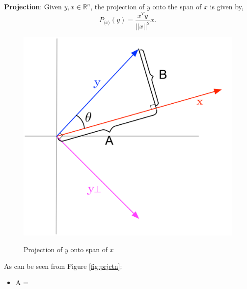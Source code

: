 \documentclass[12pt]{article}
\newenvironment{definition}[2][Definition]{\begin{trivlist}
\item[\hskip \labelsep {\bfseries #1}\hskip \labelsep {\bfseries #2}]}{\end{trivlist}}
\begin{document}
\begin{definition}{2.14} \textbf{Projection}: Given \(y,x \in \mathbb{R}^n\), the projection of $y$ onto the span of $x$ is given by,
\[P_{\langle x \rangle}(y) = \dfrac{x^T y}{||x||^2}x.\]

\begin{figure}[h]
\caption{Projection of $y$ onto span of $x$}
\centering
\includegraphics[scale=0.5]{projection}
\label{fig:prjctn2}
\end{figure}

\noindent
As can be seen from Figure \ref{fig:prjctn}:
\begin{itemize}
    \item A = 
\end{itemize}

\end{definition}
\end{document}
